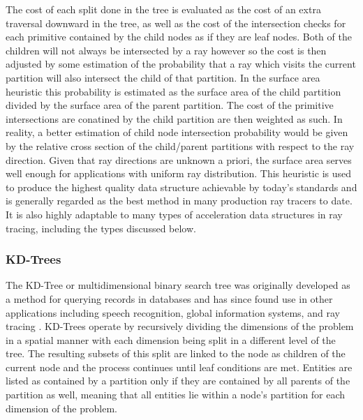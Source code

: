 \documentclass[12pt, a4paper]{article}
\begin{document}
The cost of each split done in the tree is evaluated as the cost of an extra traversal downward in the tree, as well as the cost of the intersection checks for each primitive contained by the child nodes as if they are leaf nodes. Both of the children will not always be intersected by a ray however so the cost is then adjusted by some estimation of the probability that a ray which visits the current partition will also intersect the child of that partition. In the surface area heuristic this probability is estimated as the surface area of the child partition divided by the surface area of the parent partition. The cost of the primitive intersections are conatined by the child partition are then weighted as such. In reality, a better estimation of child node intersection probability would be given by the relative cross section of the child/parent partitions with respect to the ray direction. Given that ray directions are unknown a priori, the surface area serves well enough for applications with uniform ray distribution. This heuristic is used to produce the highest quality data structure achievable by today's standards and is generally regarded as the best method in many production ray tracers to date. It is also highly adaptable to many types of acceleration data structures in ray tracing, including the types discussed below.

\subsubsection{KD-Trees}%

The KD-Tree or multidimensional binary search tree was originally developed as a method for querying records in databases and has since found use in other applications including speech recognition, global information systems, and ray tracing \cite{Bentley_1975}.  KD-Trees operate by recursively dividing the dimensions of the problem in a spatial manner with each dimension being split in a different level of the tree. The resulting subsets of this split are linked to the node as children of the current node and the process continues until leaf conditions are met. Entities are listed as contained by a partition only if they are contained by all parents of the partition as well, meaning that all entities lie within a node's partition for each dimension of the problem.
\end{document}
